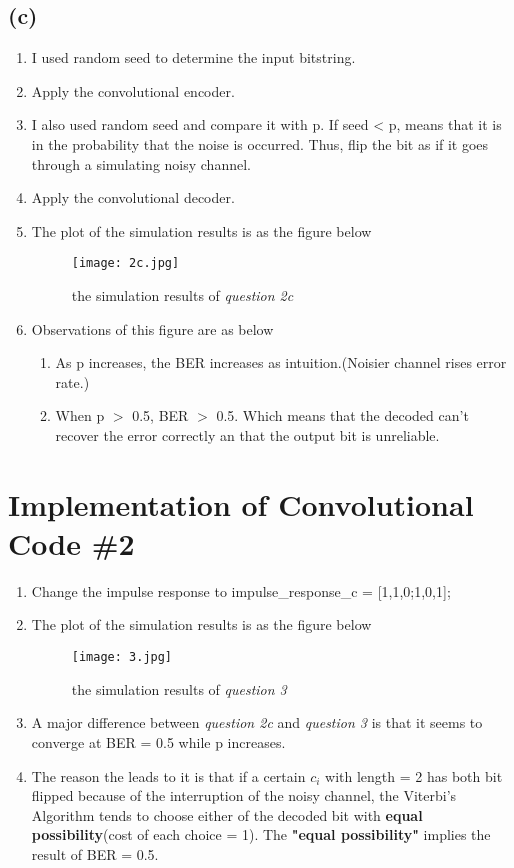 \documentclass{article}
\begin{document}
\begin{CJK*}{UTF8}{bsmi}
\subsection{(c)}
\begin{enumerate}
    \item I used random seed to determine the input bitstring.
    \item Apply the convolutional encoder.
    \item I also used random seed and compare it with p. If seed < p, means that it is in the probability that the noise is occurred. Thus, flip the bit as if it goes through a simulating noisy channel.
    \item Apply the convolutional decoder. 
    \item The plot of the simulation results is as the figure below
    \begin{figure}[h]
    \centering
    \texttt{[image: 2c.jpg]}
    \caption{\label{fig:2c.png}the simulation results of \emph{question 2c}}
    \end{figure}
    \item Observations of this figure are as below
        \begin{enumerate}
            \item As p increases, the BER increases as intuition.(Noisier channel rises error rate.)
            \item When p $>$  0.5, BER $>$ 0.5. Which means that the decoded can't recover the error correctly an that the output bit is unreliable.
        \end{enumerate}
\end{enumerate}


\section{Implementation of Convolutional Code \#2}
\begin{enumerate}
    \item Change the impulse response to impulse\_response\_c = [1,1,0;1,0,1];
    \item The plot of the simulation results is as the figure below
    \begin{figure}[h]
    \centering
    \texttt{[image: 3.jpg]}
    \caption{\label{fig:3.png}the simulation results of \emph{question 3}}
    \end{figure}
    \item A major difference between \emph{question 2c} and \emph{question 3} is that it seems to converge at BER = 0.5 while p increases.
    \item The reason the leads to it is that if a certain $c_i$ with length = 2 has both bit flipped because of the interruption of the noisy channel, the Viterbi's Algorithm tends to choose either of the decoded bit with \textbf{equal possibility}(cost of each choice = 1). The \textbf{"equal possibility"} implies the result of BER = 0.5.
    

\end{enumerate}
\end{CJK*}
\end{document}
